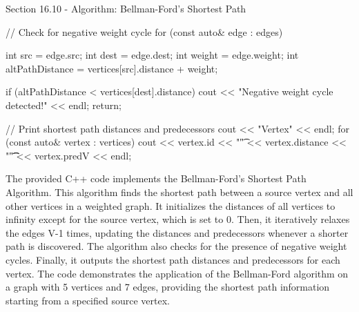 \begin{notes}{Section 16.10 - Algorithm: Bellman-Ford's Shortest Path}
\begin{highlight}
\begin{code}[C++]
{        // Check for negative weight cycle
        for (const auto& edge : edges) {
            int src = edge.src;
            int dest = edge.dest;
            int weight = edge.weight;
            int altPathDistance = vertices[src].distance + weight;
    
            if (altPathDistance < vertices[dest].distance) {
                cout << "Negative weight cycle detected!" << endl;
                return;
            }
        }
    
        // Print shortest path distances and predecessors
        cout << "Vertex\tDistance\tPredecessor" << endl;
        for (const auto& vertex : vertices) {
            cout << vertex.id << "\t" << vertex.distance << "\t\t" << vertex.predV << endl;
        }
    }
    \end{code}
        The provided C++ code implements the Bellman-Ford's Shortest Path Algorithm. This algorithm finds the shortest path between a source vertex and all other vertices in a weighted graph. It initializes the distances of all vertices to 
        infinity except for the source vertex, which is set to 0. Then, it iteratively relaxes the edges V-1 times, updating the distances and predecessors whenever a shorter path is discovered. The algorithm also checks for the presence of 
        negative weight cycles. Finally, it outputs the shortest path distances and predecessors for each vertex. The code demonstrates the application of the Bellman-Ford algorithm on a graph with 5 vertices and 7 edges, providing the shortest 
        path information starting from a specified source vertex.
    \end{highlight}
\end{notes}

